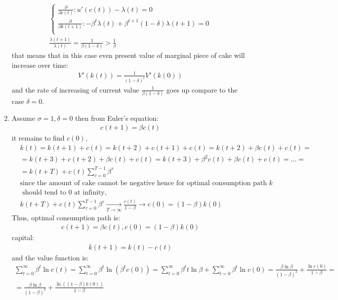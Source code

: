 \documentclass[a4paper]{article}
\begin{document}
\begin{enumerate}
\begin{align*}
\begin{cases}\frac{\partial}{\partial c(t)}: u'(c(t)) - \lambda(t) = 0\\
\frac{\partial}{\partial k(t+1)}: -\beta^t \lambda(t) + \beta^{t+1}(1 - \delta)\lambda(t+1) = 0\\
\end{cases}\\
\frac{\lambda(t+1)}{\lambda(t)} = \frac{1}{\beta(1 - \delta)} > \frac{1}{\beta}
\end{align*}
that means that in this case even present value of marginal piece of cake will increase over time:
\begin{align*}
V'(k(t)) = \frac{1}{(1 - \delta)^t}V'(k(0))
\end{align*}
and the rate of increasing of current value $\frac{1}{\beta(1-\delta)}$ goes up compare to the case $\delta = 0$.
\item Assume $\sigma = 1, \delta = 0$ then
from Euler's equation:
\begin{align*}
c(t+1) = \beta c(t)
\end{align*}
it remains to find $c(0)$,
\begin{align*}
&k(t) = k(t+1) + c(t) = k(t+2) + c(t+1) + c(t) = k(t+2) + \beta c(t) + c(t) = \\
&=k(t+3) + c(t+2) + \beta c(t) + c(t) = k(t+3) + \beta^2 c(t) + \beta c(t) + c(t) = \dots =\\
&=k(t + T) + c(t) \sum_{\tau = 0}^{T-1} \beta^{\tau} \\
&\text{since the amount of cake cannot be negative hence for optimal consumption path } k\\
&\text{ should tend to 0 at infinity, }\\
&k(t + T) + c(t) \sum_{\tau = 0}^{T-1} \beta^{\tau} \underset{T \to \infty}{\to} \frac{c(t)}{1-\beta} \to c(0) = (1-\beta)k(0)
\end{align*}
Thus, optimal consumption path is:
\begin{align*}
c(t+1) = \beta c(t), c(0) = (1-\beta)k(0)
\end{align*}
capital:
\begin{align*}
k(t+1) = k(t) - c(t)
\end{align*}
and the value function is:
\begin{align*}
\sum_{t=0}^{\infty} \beta^t \ln c(t) = \sum_{t=0}^{\infty} \beta^{t} \ln (\beta^t c(0)) = \sum_{t=0}^{\infty} \beta^t t \ln \beta + \sum_{t=0}^{\infty} \beta^t \ln c(0) = \frac{\beta \ln \beta}{(1-\beta)^2} + \frac{\ln c(0)}{1 - \beta } = \\
=\frac{\beta \ln \beta}{(1-\beta)^2} + \frac{\ln((1-\beta)k(0))}{1-\beta}
\end{align*}
\end{enumerate}
\end{document}
